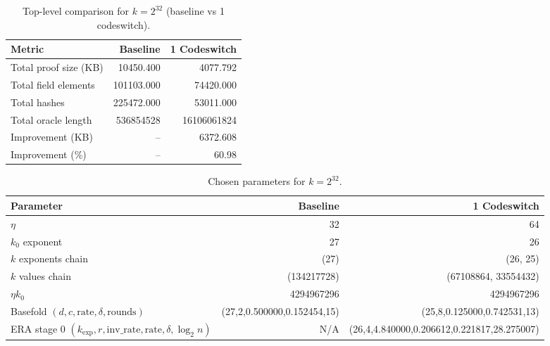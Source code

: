 
\begin{table}[htbp]
\centering
\caption{Top-level comparison for $k=2^{32}$ (baseline vs 1 codeswitch).}
\begin{tabular}{lrr}
\toprule
Metric & Baseline & 1 Codeswitch \\
\midrule
Total proof size (KB) & 10450.400 & 4077.792 \\
Total field elements & 101103.000 & 74420.000 \\
Total hashes & 225472.000 & 53011.000 \\
Total oracle length & 536854528 & 16106061824 \\
Improvement (KB) & -- & 6372.608 \\
Improvement (\%) & -- & 60.98 \\
\bottomrule
\end{tabular}
\end{table}

\begin{table}[htbp]
\centering
\caption{Chosen parameters for $k=2^{32}$.}
\begin{tabular}{lrr}
\toprule
Parameter & Baseline & 1 Codeswitch \\
\midrule
$\eta$ & 32 & 64 \\
$k_0$ exponent & 27 & 26 \\
$k$ exponents chain & (27) & (26, 25) \\
$k$ values chain & (134217728) & (67108864, 33554432) \\
$\eta k_0$ & 4294967296 & 4294967296 \\
Basefold $(d,c,\text{rate},\delta,\text{rounds})$ & (27,2,0.500000,0.152454,15) & (25,8,0.125000,0.742531,13) \\
ERA stage 0 $(k_{\text{exp}},r,\text{inv\_rate},\text{rate},\delta,\log_2 n)$ & N/A & (26,4,4.840000,0.206612,0.221817,28.275007) \\
\bottomrule
\end{tabular}
\end{table}

